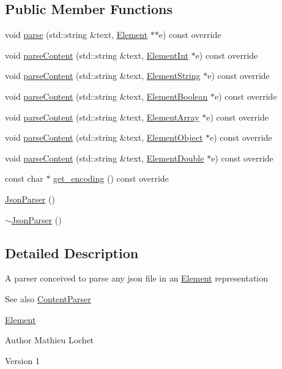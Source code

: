 \subsection*{Public Member Functions}
\begin{DoxyCompactItemize}
\item 
void \mbox{\hyperlink{classJsonParser_a3ec3a9fcc8a63f987b4749d60b0568df}{parse}} (std\+::string \&text, \mbox{\hyperlink{classElement}{Element}} $\ast$$\ast$e) const override
\item 
void \mbox{\hyperlink{classJsonParser_ac80cf84ff2565f4c1f3a0f5ddb559c96}{parse\+Content}} (std\+::string \&text, \mbox{\hyperlink{classElementInt}{Element\+Int}} $\ast$e) const override
\item 
void \mbox{\hyperlink{classJsonParser_a94737a7518f05e4ed43a753f4148b354}{parse\+Content}} (std\+::string \&text, \mbox{\hyperlink{classElementString}{Element\+String}} $\ast$e) const override
\item 
void \mbox{\hyperlink{classJsonParser_a0857f5d286e5f0b973e2791e5e7a4e83}{parse\+Content}} (std\+::string \&text, \mbox{\hyperlink{classElementBoolean}{Element\+Boolean}} $\ast$e) const override
\item 
void \mbox{\hyperlink{classJsonParser_aa728c443b247b83cdf6cedb406d8940d}{parse\+Content}} (std\+::string \&text, \mbox{\hyperlink{classElementArray}{Element\+Array}} $\ast$e) const override
\item 
void \mbox{\hyperlink{classJsonParser_a7d4fad0f0947a74ca158dc1922c97355}{parse\+Content}} (std\+::string \&text, \mbox{\hyperlink{classElementObject}{Element\+Object}} $\ast$e) const override
\item 
void \mbox{\hyperlink{classJsonParser_a07a4f2b10547d5f2251bc1f7b09d02c1}{parse\+Content}} (std\+::string \&text, \mbox{\hyperlink{classElementDouble}{Element\+Double}} $\ast$e) const override
\item 
const char $\ast$ \mbox{\hyperlink{classJsonParser_a449d410175c5055eb171f00105305ec5}{get\+\_\+encoding}} () const override
\item 
\mbox{\hyperlink{classJsonParser_af21abdfb0ceac731e44d897a0285f5d4}{Json\+Parser}} ()
\item 
\mbox{\hyperlink{classJsonParser_a7c0393b54c37f9ff30b6bb59f0ba92ce}{$\sim$\+Json\+Parser}} ()
\end{DoxyCompactItemize}


\subsection{Detailed Description}
A parser conceived to parse any json file in an \mbox{\hyperlink{classElement}{Element}} representation \begin{DoxySeeAlso}{See also}
\mbox{\hyperlink{classContentParser}{Content\+Parser}} 

\mbox{\hyperlink{classElement}{Element}}
\end{DoxySeeAlso}
\begin{DoxyAuthor}{Author}
Mathieu Lochet 
\end{DoxyAuthor}
\begin{DoxyVersion}{Version}
1 
\end{DoxyVersion}


